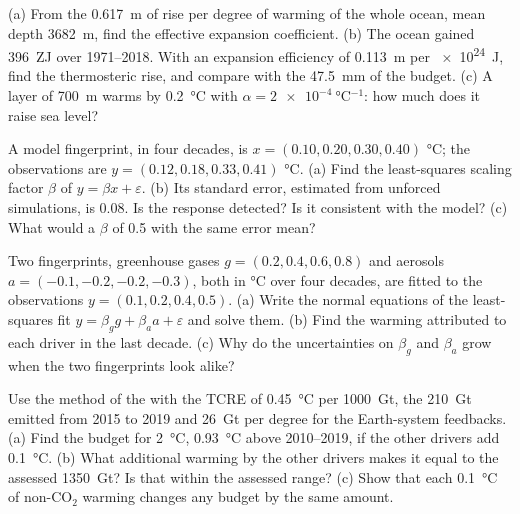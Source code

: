 \begin{exercise}[$\star\star$]\label{exo:b2:anthropogenic-climate-change:8}
(a) From the \qty{0.617}{m} of rise per degree of warming of the whole ocean, mean depth
\qty{3682}{m}, find the effective expansion coefficient. (b) The ocean gained \qty{396}{ZJ} over
1971--2018. With an expansion efficiency of \qty{0.113}{m} per \qty{e24}{J}, find the thermosteric
rise, and compare with the \qty{47.5}{mm} of the budget. (c) A layer of \qty{700}{m} warms by
\qty{0.2}{\celsius} with $\alpha = \qty{2e-4}{\celsius^{-1}}$: how much does it raise sea level?
\end{exercise}

\begin{exercise}[$\star\star$]\label{exo:b2:anthropogenic-climate-change:9}
A model fingerprint, in four decades, is $x = (0.10, 0.20, 0.30, 0.40)$ \unit{\celsius}; the
observations are $y = (0.12, 0.18, 0.33, 0.41)$ \unit{\celsius}. (a) Find the least-squares scaling
factor $\beta$ of $y = \beta x + \varepsilon$. (b) Its standard error, estimated from unforced
simulations, is \num{0.08}. Is the response detected? Is it consistent with the model? (c) What
would a $\beta$ of 0.5 with the same error mean?
\end{exercise}

\begin{exercise}[$\star\star\star$]\label{exo:b2:anthropogenic-climate-change:10}
Two fingerprints, greenhouse gases $g = (0.2, 0.4, 0.6, 0.8)$ and aerosols $a = (-0.1, -0.2,
-0.2, -0.3)$, both in \unit{\celsius} over four decades, are fitted to the observations $y = (0.1,
0.2, 0.4, 0.5)$. (a) Write the normal equations of the least-squares fit $y = \beta_g g + \beta_a a
+ \varepsilon$ and solve them. (b) Find the warming attributed to each driver in the last decade.
(c) Why do the uncertainties on $\beta_g$ and $\beta_a$ grow when the two fingerprints look alike?
\end{exercise}

\begin{exercise}[$\star\star\star$]\label{exo:b2:anthropogenic-climate-change:11}
Use the method of the  with the TCRE of \qty{0.45}{\celsius} per
\qty{1000}{Gt}, the \qty{210}{Gt} emitted from 2015 to 2019 and \qty{26}{Gt} per degree for the
Earth-system feedbacks. (a) Find the budget for \qty{2}{\celsius}, \qty{0.93}{\celsius} above
2010--2019, if the other drivers add \qty{0.1}{\celsius}. (b) What additional warming by the other
drivers makes it equal to the assessed \qty{1350}{Gt}? Is that within the assessed range? (c) Show
that each \qty{0.1}{\celsius} of non-CO$_2$ warming changes any budget by the same amount.
\end{exercise}

